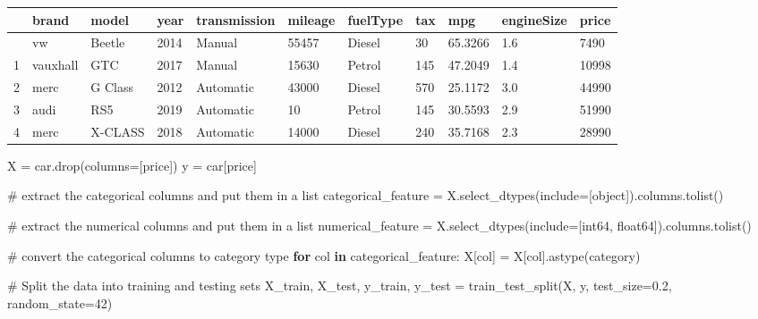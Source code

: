 \documentclass[
  letterpaper,
  DIV=11,
  numbers=noendperiod]{scrreprt}
\newenvironment{Shaded}{\begin{snugshade}}{\end{snugshade}}
\newcommand{\CommentTok}[1]{\textcolor[rgb]{0.37,0.37,0.37}{#1}}
\newcommand{\ControlFlowTok}[1]{\textcolor[rgb]{0.00,0.23,0.31}{\textbf{#1}}}
\newcommand{\DecValTok}[1]{\textcolor[rgb]{0.68,0.00,0.00}{#1}}
\newcommand{\FloatTok}[1]{\textcolor[rgb]{0.68,0.00,0.00}{#1}}
\newcommand{\KeywordTok}[1]{\textcolor[rgb]{0.00,0.23,0.31}{\textbf{#1}}}
\newcommand{\NormalTok}[1]{\textcolor[rgb]{0.00,0.23,0.31}{#1}}
\newcommand{\OperatorTok}[1]{\textcolor[rgb]{0.37,0.37,0.37}{#1}}
\newcommand{\StringTok}[1]{\textcolor[rgb]{0.13,0.47,0.30}{#1}}
\begin{document}
\begin{longtable}[]{@{}lllllllllll@{}}
\toprule\noalign{}
& brand & model & year & transmission & mileage & fuelType & tax & mpg &
engineSize & price \\
\midrule\noalign{}
\endhead
\bottomrule\noalign{}
\endlastfoot
0 & vw & Beetle & 2014 & Manual & 55457 & Diesel & 30 & 65.3266 & 1.6 &
7490 \\
1 & vauxhall & GTC & 2017 & Manual & 15630 & Petrol & 145 & 47.2049 &
1.4 & 10998 \\
2 & merc & G Class & 2012 & Automatic & 43000 & Diesel & 570 & 25.1172 &
3.0 & 44990 \\
3 & audi & RS5 & 2019 & Automatic & 10 & Petrol & 145 & 30.5593 & 2.9 &
51990 \\
4 & merc & X-CLASS & 2018 & Automatic & 14000 & Diesel & 240 & 35.7168 &
2.3 & 28990 \\
\end{longtable}

\begin{Shaded}
\begin{Highlighting}[]
\NormalTok{X }\OperatorTok{=}\NormalTok{ car.drop(columns}\OperatorTok{=}\NormalTok{[}\StringTok{\textquotesingle{}price\textquotesingle{}}\NormalTok{])}
\NormalTok{y }\OperatorTok{=}\NormalTok{ car[}\StringTok{\textquotesingle{}price\textquotesingle{}}\NormalTok{]}

\CommentTok{\# extract the categorical columns and put them in a list}
\NormalTok{categorical\_feature }\OperatorTok{=}\NormalTok{ X.select\_dtypes(include}\OperatorTok{=}\NormalTok{[}\StringTok{\textquotesingle{}object\textquotesingle{}}\NormalTok{]).columns.tolist()}

\CommentTok{\# extract the numerical columns and put them in a list}
\NormalTok{numerical\_feature }\OperatorTok{=}\NormalTok{ X.select\_dtypes(include}\OperatorTok{=}\NormalTok{[}\StringTok{\textquotesingle{}int64\textquotesingle{}}\NormalTok{, }\StringTok{\textquotesingle{}float64\textquotesingle{}}\NormalTok{]).columns.tolist()}

\CommentTok{\# convert the categorical columns to category type}
\ControlFlowTok{for}\NormalTok{ col }\KeywordTok{in}\NormalTok{ categorical\_feature:}
\NormalTok{    X[col] }\OperatorTok{=}\NormalTok{ X[col].astype(}\StringTok{\textquotesingle{}category\textquotesingle{}}\NormalTok{)}


\CommentTok{\# Split the data into training and testing sets}
\NormalTok{X\_train, X\_test, y\_train, y\_test }\OperatorTok{=}\NormalTok{ train\_test\_split(X, y, test\_size}\OperatorTok{=}\FloatTok{0.2}\NormalTok{, random\_state}\OperatorTok{=}\DecValTok{42}\NormalTok{)}
\end{Highlighting}
\end{Shaded}
\end{document}
